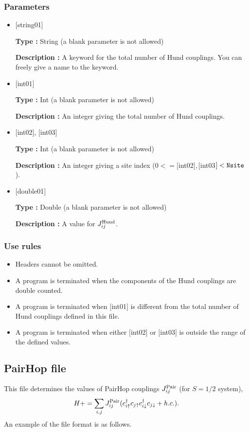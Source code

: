 \subsubsection{Parameters}
 \begin{itemize}

   \item  $[$string01$]$
   
    {\bf Type :} String (a blank parameter is not allowed)

   {\bf Description :}  A keyword for the total number of Hund couplings. You can freely give a name to the keyword.

   \item  $[$int01$]$
   
    {\bf Type :} Int (a blank parameter is not allowed)

   {\bf Description :} An integer giving the total number of Hund couplings.

  \item  $[$int02$]$, $[$int03$]$
  
 {\bf Type :} Int (a blank parameter is not allowed)

{\bf Description :} An integer giving a site index ($0<= [$int02$], [$int03$]<\verb|Nsite|$).
 
 \item  $[$double01$]$
   
   {\bf Type :} Double (a blank parameter is not allowed)

  {\bf Description :}  A value for $J_{ij}^{\rm Hund}$.
  
\end{itemize}

\subsubsection{Use rules}
\begin{itemize}
\item Headers cannot be omitted. 
\item A program is terminated when the components of the Hund couplings are double counted.
\item A program is terminated when $[$int01$]$ is different from the total number of Hund couplings defined in this file.
\item A program is terminated when either $[$int02$]$ or $[$int03$]$ is outside the range of the defined values.
\end{itemize}

\newpage
\subsection{PairHop file}
This file determines the values of PairHop couplings $J_{ij}^{\rm Pair}$ {(for $S=1/2$ system)},
\begin{equation}
H+=\sum_{i,j}J_{ij}^{\rm Pair} (c_ {i \uparrow}^{\dag}c_{j\uparrow}c_{i \downarrow}^{\dag}c_{j  \downarrow}+h.c.).
\end{equation}
An example of the file format is as follows.

